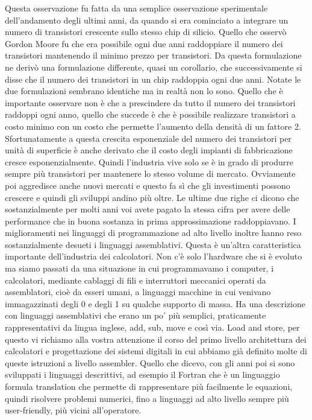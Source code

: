 Questa osservazione fu fatta da una semplice osservazione sperimentale dell'andamento degli ultimi anni, da quando si era cominciato a integrare un numero di transistori crescente sullo stesso chip di silicio.
Quello che osservò Gordon Moore fu che era possibile ogni due anni raddoppiare il numero dei transistori mantenendo il minimo prezzo per transistori.
Da questa formulazione ne derivò una formulazione differente, quasi un corollario, che successivamente si disse che il numero dei transistori in un chip raddoppia ogni due anni.
Notate le due formulazioni sembrano identiche ma in realtà non lo sono.
Quello che è importante osservare non è che a prescindere da tutto il numero dei transistori raddoppi ogni anno, quello che succede è che è possibile realizzare transistori a costo minimo con un costo che permette l'aumento della densità di un fattore 2.
Sfortunatamente a questa crescita esponenziale del numero dei transistori per unità di superficie è anche derivato che il costo degli impianti di fabbricazione cresce esponenzialmente.
Quindi l'industria vive solo se è in grado di produrre sempre più transistori per mantenere lo stesso volume di mercato.
Ovviamente poi aggredisce anche nuovi mercati e questo fa sì che gli investimenti possono crescere e quindi gli sviluppi andino più oltre.
Le ultime due righe ci dicono che sostanzialmente per molti anni voi avete pagato la stessa cifra per avere delle performance che in buona sostanza in prima approssimazione raddoppiavano.
I miglioramenti nei linguaggi di programmazione ad alto livello inoltre hanno reso sostanzialmente desueti i linguaggi assemblativi.
Questa è un'altra caratteristica importante dell'industria dei calcolatori.
Non c'è solo l'hardware che si è evoluto ma siamo passati da una situazione in cui programmavamo i computer, i calcolatori, mediante cablaggi di fili e interruttori meccanici operati da assemblatori, cioè da esseri umani, a linguaggi macchine in cui venivano immagazzinati degli 0 e degli 1 su qualche supporto di massa.
Ha una descrizione con linguaggi assemblativi che erano un po' più semplici, praticamente rappresentativi da lingua inglese, add, sub, move e così via.
Load and store, per questo vi richiamo alla vostra attenzione il corso del primo livello architettura dei calcolatori e progettazione dei sistemi digitali in cui abbiamo già definito molte di queste istruzioni a livello assembler.
Quello che dicevo, con gli anni poi si sono sviluppati i linguaggi descrittivi, ad esempio il Fortran che è un linguaggio formula translation che permette di rappresentare più facilmente le equazioni, quindi risolvere problemi numerici, fino a linguaggi ad alto livello sempre più user-friendly, più vicini all'operatore.
